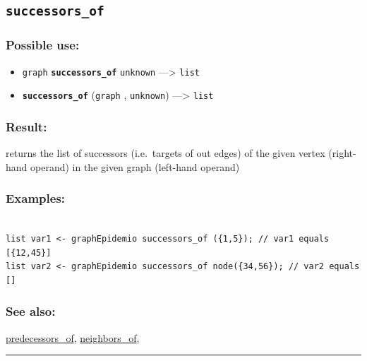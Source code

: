 \documentclass[]{book}
\providecommand{\tightlist}{%
  \setlength{\itemsep}{0pt}\setlength{\parskip}{0pt}}
\theoremstyle{definition}
\theoremstyle{definition}
\theoremstyle{definition}
\theoremstyle{remark}
\begin{document}
\subsection{\texorpdfstring{\texttt{successors\_of}}{successors\_of}}\label{successors_of}

\subsubsection{Possible use:}\label{possible-use-508}

\begin{itemize}
\tightlist
\item
  \texttt{graph} \textbf{\texttt{successors\_of}} \texttt{unknown}
  ---\textgreater{} \texttt{list}
\item
  \textbf{\texttt{successors\_of}} (\texttt{graph} , \texttt{unknown})
  ---\textgreater{} \texttt{list}
\end{itemize}

\subsubsection{Result:}\label{result-491}

returns the list of successors (i.e.~targets of out edges) of the given
vertex (right-hand operand) in the given graph (left-hand operand)

\subsubsection{Examples:}\label{examples-352}

\begin{verbatim}
 
list var1 <- graphEpidemio successors_of ({1,5}); // var1 equals [{12,45}] 
list var2 <- graphEpidemio successors_of node({34,56}); // var2 equals []
\end{verbatim}

\subsubsection{See also:}\label{see-also-198}

\href{operators-n-to-r.html\#predecessors_of}{predecessors\_of},
\href{operators-n-to-r.html\#neighbors_of}{neighbors\_of},

\begin{center}\rule{0.5\linewidth}{\linethickness}\end{center}
\end{document}
